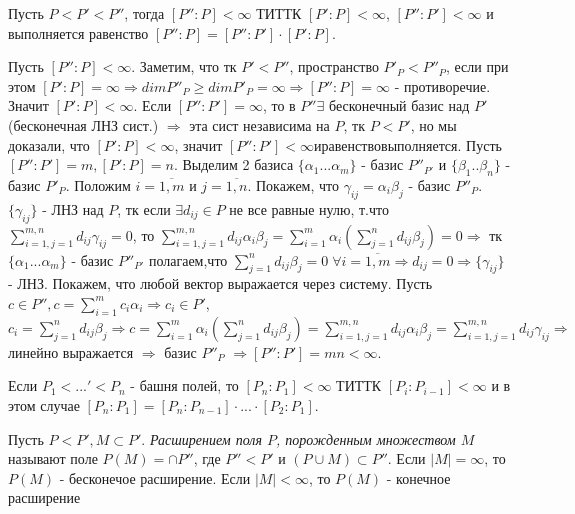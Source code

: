 \begin{proofs}
	Пусть $P < P' < P''$, тогда $[P'' : P] < \infty$ ТИТТК $[P' : P] < \infty$, $[P'' : P'] < \infty$ и выполняется равенство $[P'' : P] = [P'' : P'] \cdot [P' : P]$.
  \begin{dokvo}
     Пусть $[P'' : P] < \infty$. Заметим, что тк $P' < P''$, пространство $P'_{P} < P''_{P}$, если при этом $[P' : P] = \infty \Rightarrow dimP''_{P} \geq dimP'_{P} = \infty \Rightarrow [P'' : P] = \infty$ - противоречие. Значит $[P' : P] < \infty$.
    Если $[P'' : P'] = \infty$, то в $P'' \exists$ бесконечный базис над $P'$(бесконечная ЛНЗ сист.) $\Rightarrow$ эта сист независима на $P$, тк $P < P'$, но мы доказали, что $[P' : P] < \infty$, значит $[P'' : P'] < \infty и равенство выполняется$.
     Пусть $[P'' : P'] = m, [P' : P] = n$. Выделим 2 базиса $\{\alpha_{1} ... \alpha_{m}\}$ - базис $P''_{P'}$ и $\{\beta_{1} .. \beta_{n}\}$ - базис $P'_{P}$.
    Положим $i = \overline{1,m}$ и $j = \overline{1,n}$. Покажем, что $\gamma_{ij} = \alpha_{i}\beta_{j}$ - базис $P''_{P}$.
    $\{\gamma_{ij}\}$ - ЛНЗ над $P$, тк если $\exists d_{ij} \in P$ не все равные нулю, т.что $\sum_{i=1,j=1}^{m,n}d_{ij}\gamma_{ij} = 0$, то
    $\sum_{i=1,j=1}^{m,n}d_{ij}\alpha_{i}\beta_{j} = \sum_{i=1}^{m}\alpha_{i}(\sum_{j=1}^{n}d_{ij}\beta_{j}) = 0 \Rightarrow$
    тк $\{\alpha_{1} ... \alpha_{m}\}$ - базис $P''_{P'}$ полагаем,что $\sum_{j=1}^{n}d_{ij}\beta_{j} = 0 \;\forall i = \overline{1,m} \Rightarrow d_{ij} = 0 \Rightarrow \{\gamma_{ij}\}$ - ЛНЗ.
    Покажем, что любой вектор выражается через систему. Пусть $c \in P'', c = \sum_{i=1}^{m}c_{i}\alpha_{i} \Rightarrow c_{i} \in P'$,
    $c_{i} = \sum_{j=1}^{n}d_{ij}\beta_{j} \Rightarrow c = \sum_{i=1}^{m}\alpha_{i}(\sum_{j=1}^{n}d_{ij}\beta_{j}) = \sum_{i=1,j=1}^{m,n}d_{ij}\alpha_{i}\beta_{j} = \sum_{i=1,j=1}^{m,n}d_{ij}\gamma_{ij}
    \Rightarrow$ линейно выражается $\Rightarrow$ базис $P''_{P}$ $\Rightarrow [P'' : P'] = mn < \infty$.

	\end{dokvo}
\end{proofs}

\begin{sledsv}
  Если $P_{1} < ...' < P_{n}$ - башня полей, то $[P_{n} : P_{1}] < \infty$ ТИТТК $[P_{i} : P_{i-1}] < \infty$ и в этом случае $[P_{n} : P_{1}] = [P_{n} : P_{n-1}] \cdot ... \cdot [P_{2} : P_{1}]$.
\end{sledsv}

\begin{defs}
  Пусть $P < P', M \subset P'$. \textit{Расширением поля $P$, порожденным множеством $M$} называют поле $P(M) = \cap P''$, где $P'' < P'$
   и $(P \cup M) \subset P''$. Если $|M| = \infty$, то $P(M)$ - бесконечое расширение. Если $|M| < \infty$, то $P(M)$ - конечное расширение
\end{defs}

